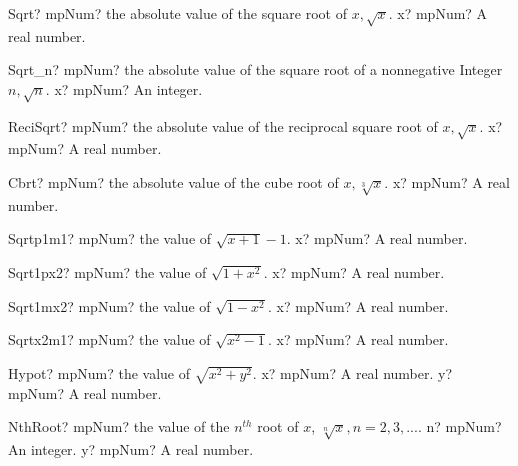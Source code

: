 \documentclass[12pt,a4paper,openany]{book}
\begin{document}
\begin{mpFunctionsExtract}
\mpFunctionOne
{Sqrt? mpNum? the absolute value of the square root of $x, \sqrt{x}$.}
{x? mpNum? A real number.}
\end{mpFunctionsExtract}

\begin{mpFunctionsExtract}
\mpFunctionOne
{Sqrt\_n? mpNum? the absolute value of the square root of a nonnegative Integer$n, \sqrt{n}$.}
{x? mpNum? An integer.}
\end{mpFunctionsExtract}

\begin{mpFunctionsExtract}
\mpFunctionOne
{ReciSqrt? mpNum? the absolute value of the reciprocal square root of $x, \sqrt{x}$.}
{x? mpNum? A real number.}
\end{mpFunctionsExtract}

\begin{mpFunctionsExtract}
\mpFunctionOne
{Cbrt? mpNum? the absolute value of the cube root of $x, \sqrt[3]{x}$.}
{x? mpNum? A real number.}
\end{mpFunctionsExtract}

\begin{mpFunctionsExtract}
\mpFunctionOne
{Sqrtp1m1? mpNum? the value of $\sqrt{x+1}-1$.}
{x? mpNum? A real number.}
\end{mpFunctionsExtract}

\begin{mpFunctionsExtract}
\mpFunctionOne
{Sqrt1px2? mpNum? the value of $\sqrt{1+x^2}$.}
{x? mpNum? A real number.}
\end{mpFunctionsExtract}

\begin{mpFunctionsExtract}
\mpFunctionOne
{Sqrt1mx2? mpNum? the value of $\sqrt{1-x^2}$.}
{x? mpNum? A real number.}
\end{mpFunctionsExtract}

\begin{mpFunctionsExtract}
\mpFunctionOne
{Sqrtx2m1? mpNum? the value of $\sqrt{x^2-1}$.}
{x? mpNum? A real number.}
\end{mpFunctionsExtract}

\begin{mpFunctionsExtract}
\mpFunctionTwo
{Hypot? mpNum? the value of $\sqrt{x^2+y^2}$.}
{x? mpNum? A real number.}
{y? mpNum? A real number.}
\end{mpFunctionsExtract}

\begin{mpFunctionsExtract}
\mpFunctionTwo
{NthRoot? mpNum? the value of the $n^{th}$ root of $x$, $\sqrt[n]{x}, n=2,3,...$.}
{n? mpNum? An integer.}
{y? mpNum? A real number.}
\end{mpFunctionsExtract}
\end{document}
